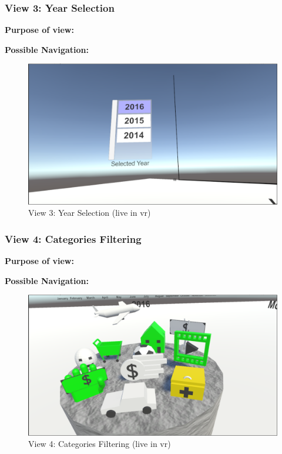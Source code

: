 \subsubsection{View 3: Year Selection}

\textbf{Purpose of view:}


\textbf{Possible Navigation:}

\begin{figure}[h]
	\begin{center}
		\includegraphics[width=14cm]{03_Figures/08_Development/View3_YearSelection.png}
		\caption{View 3: Year Selection (live in \gls{vr})}
		\label{fig:unityview3}
	\end{center}
\end{figure}



\subsubsection{View 4: Categories Filtering}

\textbf{Purpose of view:}


\textbf{Possible Navigation:}

\begin{figure}[h]
	\begin{center}
		\includegraphics[width=14cm]{03_Figures/08_Development/View4_CategoriesFiltering_Loading.png}
		\caption{View 4: Categories Filtering (live in \gls{vr})}
		\label{fig:unityview4}
	\end{center}
\end{figure}


